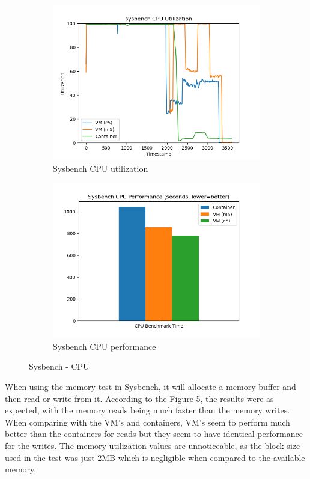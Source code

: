 \documentclass[11pt]{article}
\begin{document}
\begin{figure}[hbt!]
\centering
\begin{subfigure}{.5\textwidth}
  \centering
  \includegraphics[width=1.1\linewidth]{sysbench_cpu.png}
  \caption{Sysbench CPU utilization}
  \label{fig:sysb1}
\end{subfigure}%
\begin{subfigure}{.5\textwidth}
  \centering
  \includegraphics[width=1.1\linewidth]{sysbench_cpu_bar.png}
  \caption{Sysbench CPU performance}
  \label{fig:sysb2}
\end{subfigure}
\caption{Sysbench - CPU}
\label{fig:rubis}
\end{figure}

When using the memory test in Sysbench, it will allocate a memory buffer and then read or write from it. According to the Figure 5, the results were as expected, with the memory reads being much faster than the memory writes. When comparing with the VM's and containers, VM's seem to perform much better than the containers for reads but they seem to have identical performance for the writes. The memory utilization values are unnoticeable, as the block size used in the test was just 2MB which is negligible when compared to the available memory. 
\end{document}

